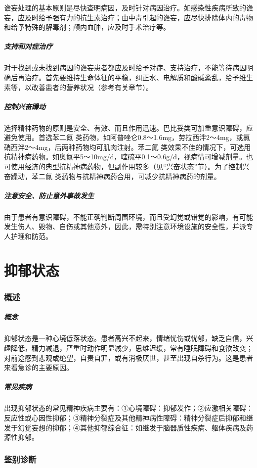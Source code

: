 谵妄处理的基本原则是尽快查明病因，及时针对病因治疗。如感染性疾病所致的谵妄，应及时给予强有力的抗生素治疗；由中毒引起的谵妄，应尽快排除体内的毒物和给予特殊的解毒剂；颅内血肿，应及时手术治疗等。

\subparagraph{支持和对症治疗}

对于找到或未找到病因的谵妄患者都应及时给予对症、支持治疗，不能等待病因明确后再治疗。首先要维持生命体征的平稳，纠正水、电解质和酸碱紊乱，给予维生素等，以改善患者的营养状况（参考有关章节）。

\subparagraph{控制兴奋躁动}

选择精神药物的原则是安全、有效、而且作用迅速。巴比妥类可加重意识障碍，应避免使用。首选苯二氮{}
类药物，如阿普唑仑0.8～1.6mg，劳拉西泮2～4mg，或氯硝西泮2～4mg，后两种药物均可肌肉注射。苯二氮{}
类效果不佳的情况下，可选用抗精神病药物。如奥氮平5～10mg/d，喹硫平0.1～0.6g/d，视病情可增减剂量。也可使用经济的典型抗精神病药物，但副作用较多（见“兴奋状态”节）。为了控制兴奋躁动，苯二氮{}
类药物与抗精神病药合用，可减少抗精神病药的剂量。

\subparagraph{注意安全、防止意外事故发生}

由于患者有意识障碍，不能正确判断周围环境，而且受幻觉或错觉的影响，有可能发生伤人、毁物、自伤或其他意外，因此，需特别注意环境设施的安全性，并派专人护理和防范。

\protect\hypertarget{text00045.html}{}{}

\section{抑郁状态}

\subsubsection{概述}

\subparagraph{概念}

抑郁状态是一种心境低落状态。患者高兴不起来，情绪忧伤或忧郁，缺乏自信，兴趣降低，精力减退，严重时动作明显减少，思维迟缓，常有睡眠障碍和食欲改变；对前途感到悲观或绝望，自责自罪，或有消极厌世，甚至出现自杀行为。这是患者来看急诊的主要原因。

\subparagraph{常见疾病}

出现抑郁状态的常见精神疾病主要有：①心境障碍：抑郁发作；②应激相关障碍：反应性或心因性抑郁；③精神分裂症及其他精神病性障碍：精神分裂症后抑郁和继发于幻觉妄想的抑郁；④其他抑郁综合征：如继发于脑器质性疾病、躯体疾病及药源性抑郁。

\subsubsection{鉴别诊断}

